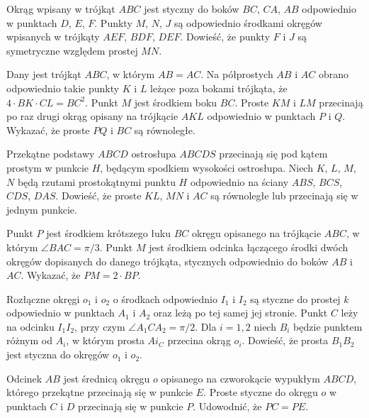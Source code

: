 

\begin{exercise}[LX/1/3]
    Okrąg wpisany w trójkąt $ABC$ jest styczny do boków $BC$, $CA$, $AB$ odpowiednio w punktach $D$, $E$, $F$.
    Punkty $M$, $N$, $J$ są odpowiednio środkami okręgów wpisanych w trójkąty $AEF$, $BDF$, $DEF$.
    Dowieść, że punkty $F$ i $J$ są symetryczne względem prostej $MN$.
\end{exercise}

\begin{exercise}[LX/1/6]
    Dany jest trójkąt $ABC$, w którym $AB = AC$. Na półprostych $AB$ i $AC$ obrano odpowiednio takie punkty $K$ i $L$ leżące poza bokami trójkąta, że $4 \cdot BK \cdot CL = BC^2$.
    Punkt $M$ jest środkiem boku $BC$.
    Proste $KM$ i $LM$ przecinają po raz drugi okrąg opisany na trójkącie $AKL$ odpowiednio w punktach $P$ i $Q$.
    Wykazać, że proste $PQ$ i $BC$ są równoległe.
\end{exercise}

\begin{exercise}[LX/1/8]
    Przekątne podstawy $ABCD$ ostrosłupa $ABCDS$ przecinają się pod kątem prostym w punkcie $H$, będącym spodkiem wysokości ostrosłupa.
    Niech $K$, $L$, $M$, $N$ będą rzutami prostokątnymi punktu $H$ odpowiednio na ściany $ABS$, $BCS$, $CDS$, $DAS$.
    Dowieść, że proste $KL$, $MN$ i $AC$ są równoległe lub przecinają się w jednym punkcie.
\end{exercise}

\begin{exercise}[LX/1/10]
    Punkt $P$ jest środkiem krótszego łuku $BC$ okręgu opisanego na trójkącie $ABC$, w którym $\angle BAC = \pi/3$.
Punkt $M$ jest środkiem odcinka łączącego środki dwóch okręgów dopisanych do danego trójkąta, stycznych odpowiednio do boków $AB$ i $AC$. Wykazać, że $PM = 2 \cdot BP$.
\end{exercise}

\begin{exercise}[LX/2/3]
    Rozłączne okręgi $o_1$ i $o_2$ o środkach odpowiednio $I_1$ i $I_2$ są styczne do prostej $k$ odpowiednio w punktach $A_1$ i $A_2$ oraz leżą po tej samej jej stronie.
    Punkt $C$ leży na odcinku $I_1I_2$, przy czym $\angle A_1 C A_2 = \pi/2$.
    Dla $i = 1, 2$ niech $B_i$ będzie punktem różnym od $A_i$, w którym prosta $Ai_C$ przecina okrąg $o_i$.
    Dowieść, że prosta $B_1B_2$ jest styczna do okręgów $o_1$ i $o_2$.
\end{exercise}

\begin{exercise}[LX/2/4]
    Odcinek $AB$ jest średnicą okręgu $o$ opisanego na czworokącie wypukłym $ABCD$, którego przekątne przecinają się w punkcie $E$. Proste styczne do okręgu $o$ w punktach $C$ i $D$ przecinają się w punkcie $P$.
    Udowodnić, że $PC = PE$.
\end{exercise}

